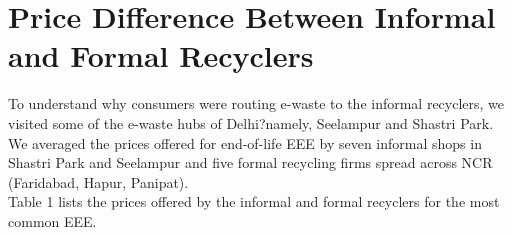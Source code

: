 \documentclass[a4paper, 12pt]{article}
\begin{document}
                    \section{Price Difference Between Informal and Formal Recyclers}
                    
                    To understand why consumers were routing e-waste to the informal recyclers, we visited some of the e-waste hubs of Delhi?namely, Seelampur and Shastri Park. We averaged the prices offered for end-of-life EEE by seven informal shops in Shastri Park and Seelampur and five formal recycling firms spread across NCR (Faridabad, Hapur, Panipat).\\
                    
                    Table 1 lists the prices offered by the informal and formal recyclers for the most common EEE. \\
                    
\end{document}
